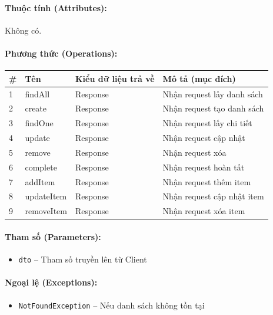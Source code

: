 \documentclass[12pt,a4paper]{article}
\begin{document}
\paragraph{Thuộc tính (Attributes):}
Không có.

\paragraph{Phương thức (Operations):}
\begin{longtable}{|p{0.6cm}|p{5.0cm}|p{2.8cm}|p{5.4cm}|}
\hline
\textbf{\#} & \textbf{Tên} & \textbf{Kiểu dữ liệu trả về} & \textbf{Mô tả (mục đích)} \\ \hline
\endhead
1 & findAll & Response & Nhận request lấy danh sách \\ \hline
2 & create & Response & Nhận request tạo danh sách \\ \hline
3 & findOne & Response & Nhận request lấy chi tiết \\ \hline
4 & update & Response & Nhận request cập nhật \\ \hline
5 & remove & Response & Nhận request xóa \\ \hline
6 & complete & Response & Nhận request hoàn tất \\ \hline
7 & addItem & Response & Nhận request thêm item \\ \hline
8 & updateItem & Response & Nhận request cập nhật item \\ \hline
9 & removeItem & Response & Nhận request xóa item \\ \hline
\end{longtable}

\paragraph{Tham số (Parameters):}
\begin{itemize}[leftmargin=*]
    \item \texttt{dto} – Tham số truyền lên từ Client
\end{itemize}


\paragraph{Ngoại lệ (Exceptions):}
\begin{itemize}[leftmargin=*]
    \item \texttt{NotFoundException} – Nếu danh sách không tồn tại
\end{itemize}
\end{document}
